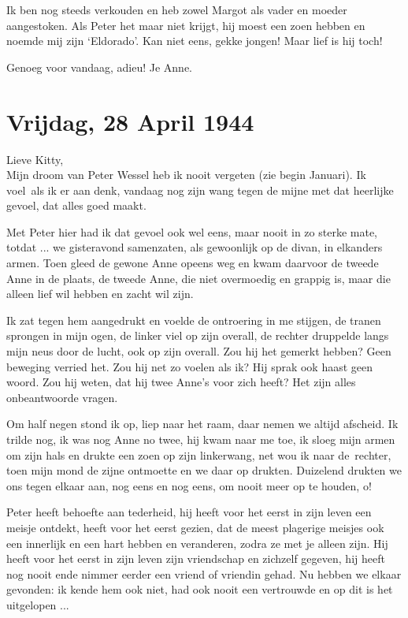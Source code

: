 \documentclass{book}
\begin{document}
Ik ben nog steeds verkouden en heb zowel Margot als vader en moeder aangestoken.
Als Peter het maar niet krijgt, hij moest een zoen hebben en noemde mij zijn
`Eldorado'. Kan niet eens, gekke jongen! Maar lief is hij toch!

Genoeg voor vandaag, adieu! Je Anne.

\section*{Vrijdag, 28 April 1944}

Lieve Kitty,\\
Mijn droom van Peter Wessel heb ik nooit vergeten (zie begin
Januari). Ik voel~als ik er aan denk, vandaag nog zijn wang tegen de mijne met
dat heerlijke gevoel, dat alles goed maakt.

Met Peter hier had ik dat gevoel ook wel eens, maar nooit in zo sterke mate,
totdat ... we gisteravond samenzaten, als gewoonlijk op de divan, in elkanders
armen. Toen gleed de gewone Anne opeens weg en kwam daarvoor de tweede Anne in
de plaats, de tweede Anne, die niet overmoedig en grappig is, maar die alleen
lief wil hebben en zacht wil zijn.

Ik zat tegen hem aangedrukt en voelde de ontroering in me stijgen, de tranen
sprongen in mijn ogen, de linker viel op zijn overall, de rechter druppelde
langs mijn neus door de lucht, ook op zijn overall. Zou hij het gemerkt hebben?
Geen beweging verried het. Zou hij net zo voelen als ik? Hij sprak ook haast
geen woord. Zou hij weten, dat hij twee Anne's voor zich heeft? Het zijn alles
onbeantwoorde vragen.

Om half negen stond ik op, liep naar het raam, daar nemen we altijd afscheid. Ik
trilde nog, ik was nog Anne no twee, hij kwam naar me toe, ik sloeg mijn armen
om zijn hals en drukte een zoen op zijn linkerwang, net wou ik naar de~rechter,
toen mijn mond de zijne ontmoette en we daar op drukten. Duizelend drukten we
ons tegen elkaar aan, nog eens en nog eens, om nooit meer op te houden, o!

Peter heeft behoefte aan tederheid, hij heeft voor het eerst in zijn leven een
meisje ontdekt, heeft voor het eerst gezien, dat de meest plagerige meisjes ook
een innerlijk en een hart hebben en veranderen, zodra ze met je alleen zijn. Hij
heeft voor het eerst in zijn leven zijn vriendschap en zichzelf gegeven, hij
heeft nog nooit ende nimmer eerder een vriend of vriendin gehad. Nu hebben we
elkaar gevonden: ik kende hem ook niet, had ook nooit een vertrouwde en op dit
is het uitgelopen ...
\end{document}
